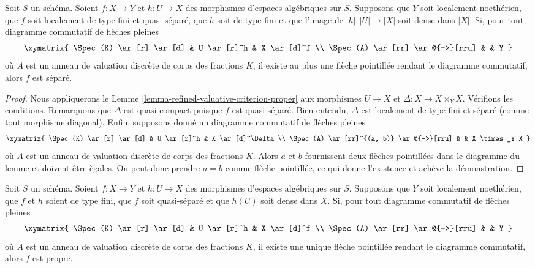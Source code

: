 \begin{lemma}
\label{lemma-refined-valuative-criterion-separated}
Soit $S$ un sch\'ema. Soient $f : X \to Y$ et $h : U \to X$ des
morphismes d'espaces alg\'ebriques sur $S$. Supposons que $Y$ soit
localement noeth\'erien, que $f$ soit localement de type fini et quasi-s\'epar\'e,
que $h$ soit de type fini et que l'image de $|h| : |U| \to |X|$
soit dense dans $|X|$.
Si, pour tout diagramme commutatif de fl\`eches pleines
$$
\xymatrix{
\Spec(K) \ar[r] \ar[d] & U \ar[r]^h & X \ar[d]^f \\
\Spec(A) \ar[rr] \ar@{-->}[rru] & & Y
}
$$
o\`u $A$ est un anneau de valuation discr\`ete de corps des fractions $K$, il
existe au plus une fl\`eche pointill\'ee rendant le diagramme commutatif, alors $f$ est
s\'epar\'e.
\end{lemma}

\begin{proof}
Nous appliquerons le Lemme \ref{lemma-refined-valuative-criterion-proper}
aux morphismes $U \to X$ et $\Delta : X \to X \times_Y X$.
V\'erifions les conditions. Remarquons que $\Delta$ est quasi-compact puisque
$f$ est quasi-s\'epar\'e. Bien entendu, $\Delta$ est localement de type fini et
s\'epar\'e (comme tout morphisme diagonal).
Enfin, supposons donn\'e un diagramme commutatif de fl\`eches pleines
$$
\xymatrix{
\Spec(K) \ar[r] \ar[d] & U \ar[r]^h & X \ar[d]^\Delta \\
\Spec(A) \ar[rr]^{(a, b)} \ar@{-->}[rru] & & X \times_Y X
}
$$
o\`u $A$ est un anneau de valuation discr\`ete de corps des fractions $K$.
Alors $a$ et $b$ fournissent deux fl\`eches pointill\'ees dans le diagramme du lemme
et doivent \^etre \`egales. On peut donc prendre $a = b$ comme fl\`eche pointill\'ee,
ce qui donne l'existence et ach\`eve la d\'emonstration.
\end{proof}

\begin{lemma}
\label{lemma-refined-valuative-criterion-universally-closed}
Soit $S$ un sch\'ema.
Soient $f : X \to Y$ et $h : U \to X$ des morphismes d'espaces alg\'ebriques sur $S$.
Supposons que $Y$ soit localement noeth\'erien, que $f$ et $h$ soient de type fini,
que $f$ soit quasi-s\'epar\'e et
que $h(U)$ soit dense dans $X$. Si, pour tout diagramme commutatif de fl\`eches pleines
$$
\xymatrix{
\Spec(K) \ar[r] \ar[d] & U \ar[r]^h & X \ar[d]^f \\
\Spec(A) \ar[rr] \ar@{-->}[rru] & & Y
}
$$
o\`u $A$ est un anneau de valuation discr\`ete de corps des fractions $K$, il
existe une unique fl\`eche pointill\'ee rendant le diagramme commutatif, alors $f$ est propre.
\end{lemma}

